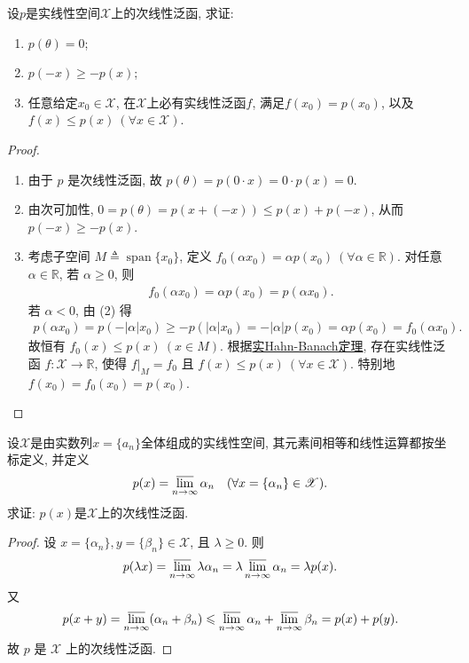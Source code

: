 \documentclass[../../main.tex]{subfiles}%
\begin{document}
\begin{example}
设$p$是实线性空间$\mathscr{X}$上的次线性泛函, 求证:
\begin{enumerate}[(1)]
\item $p(\theta) = 0$;
\item $p(-x) \geqslant -p(x)$;
\item 任意给定$x_0 \in \mathscr{X}$, 在$\mathscr{X}$上必有实线性泛函$f$, 满足$f(x_0) = p(x_0)$, 以及$f(x) \leqslant p(x) \ (\forall x \in \mathscr{X})$.
\end{enumerate}
\end{example}
\begin{proof}
\begin{enumerate}[(1)]
\item 由于 $p$ 是次线性泛函, 故 $p(\theta)=p(0\cdot x)=0\cdot p(x)=0$.
\item 由次可加性, $0=p(\theta)=p(x+(-x))\leqslant p(x)+p(-x)$, 从而 $p(-x)\geqslant -p(x)$.
\item 考虑子空间 $M\triangleq \operatorname{span}\{x_0\}$, 定义 $f_0(\alpha x_0)=\alpha p(x_0)\ (\forall \alpha\in\mathbb{R})$. 对任意 $\alpha\in\mathbb{R}$, 若 $\alpha\geqslant 0$, 则
\begin{align*}
f_0(\alpha x_0)=\alpha p(x_0)=p(\alpha x_0).
\end{align*}
若 $\alpha<0$, 由 (2) 得
\begin{align*}
p(\alpha x_0)=p(-|\alpha|x_0)\geqslant -p(|\alpha|x_0)=-|\alpha|p(x_0)=\alpha p(x_0)=f_0(\alpha x_0).
\end{align*}
故恒有 $f_0(x)\leqslant p(x)\ (x\in M)$. 根据\hyperref[theorem:泛函分析--实Hahn-Banach定理]{实Hahn-Banach定理}, 存在实线性泛函 $f:\mathscr{X}\to\mathbb{R}$, 使得 $f|_{M}=f_0$ 且 $f(x)\leqslant p(x)\ (\forall x\in\mathscr{X})$. 特别地 $f(x_0)=f_0(x_0)=p(x_0)$.
\end{enumerate}
\end{proof}

\begin{example}
设$\mathscr{X}$是由实数列$x = \{a_n\}$全体组成的实线性空间, 其元素间相等和线性运算都按坐标定义, 并定义
\begin{align*}
p(x) = \varlimsup\limits_{n\to\infty} \alpha_n \quad (\forall x = \{\alpha_n\} \in \mathscr{X}).
\end{align*}
求证: $p(x)$是$\mathscr{X}$上的次线性泛函.
\end{example}
\begin{proof}
设 $x = \{\alpha_n\}, y = \{\beta_n\} \in \mathscr{X}$, 且 $\lambda \geqslant 0$. 则
\begin{align*}
p(\lambda x) = \varlimsup\limits_{n\to\infty} \lambda \alpha_n = \lambda \varlimsup\limits_{n\to\infty} \alpha_n = \lambda p(x).
\end{align*}
又
\begin{align*}
p(x+y) = \varlimsup\limits_{n\to\infty} (\alpha_n + \beta_n) \leqslant \varlimsup\limits_{n\to\infty} \alpha_n + \varlimsup\limits_{n\to\infty} \beta_n = p(x) + p(y).
\end{align*}
故 $p$ 是 $\mathscr{X}$ 上的次线性泛函.
\end{proof}
\end{document}
